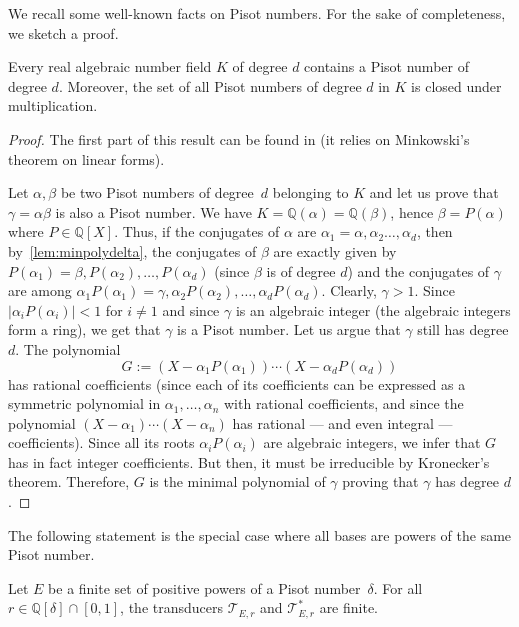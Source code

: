 \documentclass[12pt,reqno]{amsart}
\begin{document}
We recall some well-known facts on Pisot numbers. For the sake of completeness, we sketch a proof.

\begin{lemma}
\label{lem:Pisot}
    Every real algebraic number field $K$ of degree $d$ contains a Pisot number of degree $d$. Moreover, the set of all Pisot numbers of degree $d$ in $K$ is closed under multiplication.
\end{lemma}

\begin{proof}
    The first part of this result can be found in \cite[Thm.~2]{Salem} (it relies on Minkowski's theorem on linear forms). 

    Let $\alpha,\beta$ be two Pisot numbers of degree~$d$ belonging to $K$ and let us prove that $\gamma=\alpha\beta$ is also a Pisot number. We have $K=\mathbb{Q}(\alpha)=\mathbb{Q}(\beta)$, hence $\beta=P(\alpha)$ where $P\in\mathbb{Q}[X]$. Thus, if the conjugates of $\alpha$ are $\alpha_1=\alpha,\alpha_2\ldots,\alpha_d$, then by~\cref{lem:minpolydelta}, the conjugates of $\beta$ are exactly given by $P(\alpha_1)=\beta,P(\alpha_2),\ldots,P(\alpha_d)$ (since $\beta$ is of degree $d$) and the conjugates of $\gamma$ are among $\alpha_1P(\alpha_1)=\gamma,\alpha_2P(\alpha_2),\ldots,\alpha_dP(\alpha_d)$. Clearly, $\gamma>1$. Since $|\alpha_iP(\alpha_i)|<1$ for $i\ne 1$ and since $\gamma$ is an algebraic integer (the algebraic integers form a ring), we get that $\gamma$ is a Pisot number. Let us argue that $\gamma$ still has degree $d$. The polynomial 
    \[
        G:=(X-\alpha_1P(\alpha_1))\cdots(X-\alpha_dP(\alpha_d))
    \]
    has rational coefficients (since each of its coefficients can be expressed as a symmetric polynomial in $\alpha_1,\ldots,\alpha_n$ with rational coefficients, and since the polynomial $(X-\alpha_1)\cdots(X-\alpha_n)$ has rational --- and even integral --- coefficients). Since all its roots $\alpha_iP(\alpha_i)$ are algebraic integers, we infer that $G$ has in fact integer coefficients. But then, it must be irreducible by Kronecker's theorem. Therefore, $G$ is the minimal polynomial of $\gamma$ proving that $\gamma$ has degree $d$.
\end{proof}


The following statement is the special case where all bases are powers of the same Pisot number. 

\begin{corollary}
\label{cor:pisotpowers}
  Let $E$ be a finite set of positive powers of a Pisot number~$\delta$.  
  For all $r\in\mathbb{Q}[\delta]\cap [0,1]$, the transducers $\mathcal{T}_{E,r}$ and $\mathcal{T}^*_{E,r}$ are finite. 
\end{corollary}
\end{document}
